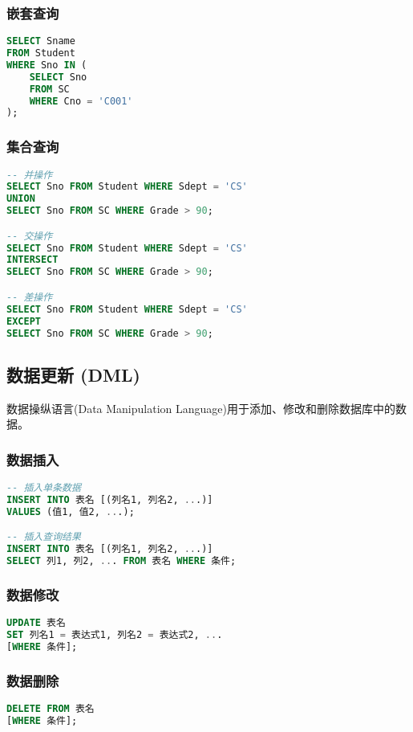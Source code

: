 \documentclass{../../note}
\begin{document}
\subsubsection{嵌套查询}
\begin{lstlisting}[language=SQL]
SELECT Sname
FROM Student
WHERE Sno IN (
    SELECT Sno
    FROM SC
    WHERE Cno = 'C001'
);
\end{lstlisting}

\subsubsection{集合查询}
\begin{lstlisting}[language=SQL]
-- 并操作
SELECT Sno FROM Student WHERE Sdept = 'CS'
UNION
SELECT Sno FROM SC WHERE Grade > 90;

-- 交操作
SELECT Sno FROM Student WHERE Sdept = 'CS'
INTERSECT
SELECT Sno FROM SC WHERE Grade > 90;

-- 差操作
SELECT Sno FROM Student WHERE Sdept = 'CS'
EXCEPT
SELECT Sno FROM SC WHERE Grade > 90;
\end{lstlisting}

\subsection{数据更新 (DML)}
数据操纵语言(Data Manipulation Language)用于添加、修改和删除数据库中的数据。

\subsubsection{数据插入}
\begin{lstlisting}[language=SQL]
-- 插入单条数据
INSERT INTO 表名 [(列名1, 列名2, ...)]
VALUES (值1, 值2, ...);

-- 插入查询结果
INSERT INTO 表名 [(列名1, 列名2, ...)]
SELECT 列1, 列2, ... FROM 表名 WHERE 条件;
\end{lstlisting}

\subsubsection{数据修改}
\begin{lstlisting}[language=SQL]
UPDATE 表名
SET 列名1 = 表达式1, 列名2 = 表达式2, ...
[WHERE 条件];
\end{lstlisting}

\subsubsection{数据删除}
\begin{lstlisting}[language=SQL]
DELETE FROM 表名
[WHERE 条件];
\end{lstlisting}
\end{document}
